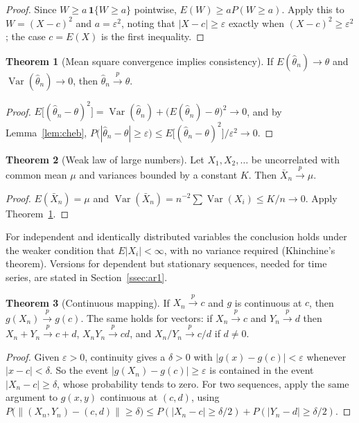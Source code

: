 \documentclass[11pt,a4paper]{article}
\numberwithin{equation}{section}
\DeclareMathOperator{\Var}{Var}
\theoremstyle{definition}
\newtheorem{thm}{Theorem}[subsection]
\begin{document}
\begin{proof}
Since $W \geq a\,\mathbf 1\{W \geq a\}$ pointwise, $E(W) \geq aP(W \geq a)$. Apply this to $W = (X - c)^2$ and $a = \varepsilon^2$, noting that
$|X - c| \geq \varepsilon$ exactly when $(X - c)^2 \geq \varepsilon^2$; the case $c = E(X)$ is the first inequality.
\end{proof}

\begin{thm}[Mean square convergence implies consistency]
\label{thm:mse}
If $E(\hat\theta_n) \to \theta$ and $\Var(\hat\theta_n) \to 0$, then $\hat\theta_n \xrightarrow{p} \theta$.
\end{thm}

\begin{proof}
$E\bigl[(\hat\theta_n - \theta)^2\bigr] = \Var(\hat\theta_n) + \bigl(E(\hat\theta_n) - \theta\bigr)^2 \to 0$, and by Lemma~\ref{lem:cheb},
$P\bigl(|\hat\theta_n - \theta| \geq \varepsilon\bigr) \leq E\bigl[(\hat\theta_n - \theta)^2\bigr]/\varepsilon^2 \to 0$.
\end{proof}

\begin{thm}[Weak law of large numbers]
\label{thm:wlln}
Let $X_1, X_2, \dots$ be uncorrelated with common mean $\mu$ and variances bounded by a constant $K$. Then $\bar X_n \xrightarrow{p} \mu$.
\end{thm}

\begin{proof}
$E(\bar X_n) = \mu$ and $\Var(\bar X_n) = n^{-2}\sum\Var(X_i) \leq K/n \to 0$. Apply Theorem~\ref{thm:mse}.
\end{proof}

For independent and identically distributed variables the conclusion holds under the weaker condition that $E|X_i| < \infty$, with no variance
required (Khinchine's theorem). Versions for dependent but stationary sequences, needed for time series, are stated in
Section~\ref{ssec:ar1}.

\begin{thm}[Continuous mapping]
\label{thm:cmt}
If $X_n \xrightarrow{p} c$ and $g$ is continuous at $c$, then $g(X_n) \xrightarrow{p} g(c)$. The same holds for vectors: if
$X_n \xrightarrow{p} c$ and $Y_n \xrightarrow{p} d$ then $X_n + Y_n \xrightarrow{p} c + d$, $X_nY_n \xrightarrow{p} cd$, and $X_n/Y_n \xrightarrow{p} c/d$ if $d \neq 0$.
\end{thm}

\begin{proof}
Given $\varepsilon > 0$, continuity gives a $\delta > 0$ with $|g(x) - g(c)| < \varepsilon$ whenever $|x - c| < \delta$. So the event
$|g(X_n) - g(c)| \geq \varepsilon$ is contained in the event $|X_n - c| \geq \delta$, whose probability tends to zero. For two sequences, apply the same
argument to $g(x, y)$ continuous at $(c, d)$, using
$P\bigl(\|(X_n, Y_n) - (c, d)\| \geq \delta\bigr) \leq P(|X_n - c| \geq \delta/2) + P(|Y_n - d| \geq \delta/2)$.
\end{proof}
\end{document}

